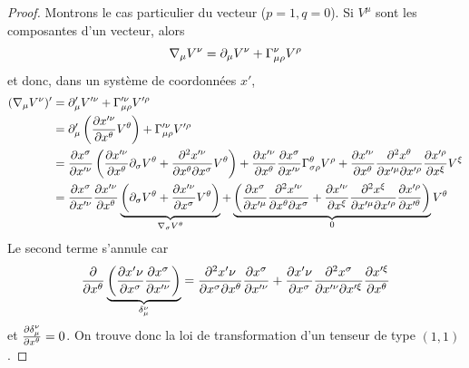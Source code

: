 \documentclass[a4paper,11pt]{report}
\begin{document}
                \begin{proof}
                    Montrons le cas particulier du vecteur ($p=1,q=0$). Si $V^\mu$ sont les composantes d'un vecteur, alors
                    \begin{equation}
                        \nabla_\mu V^\nu = \partial_\mu V^\nu + \Gamma^\nu_{\mu\rho} V^\rho
                    \end{equation}
                    et donc, dans un système de coordonnées $x'$, 
                    \begin{align}
                        (\nabla_\mu V^\nu)' &= \partial'_\mu V'^\nu + \Gamma'^\nu_{\mu\rho} V'^\rho \\
                        &= \partial'_\mu\left( \pdv{x'^\nu}{x^\theta} V^\theta\right) + \Gamma'^\nu_{\mu\rho} V'^\rho\\
                        &= \pdv{x^\sigma}{x'^\nu}\left( \pdv{x'^\nu}{x^\theta}\partial_\sigma V^\theta + \pdv{x'^\nu}{x^\theta}{x^\sigma} V^\theta \right) + \pdv{x'^\nu}{x^\theta}\pdv{x^\sigma}{x'^\nu}\Gamma^\theta_{\sigma\rho} V^\rho + \pdv{x'^\nu}{x^\theta}\pdv{x^\theta}{x'^\mu}{x'^\rho}\pdv{x'^\rho}{x^\xi} V^\xi\\
                        &=  \pdv{x^\sigma}{x'^\nu} \pdv{x'^\nu}{x^\theta}\underbrace{\left(\partial_\sigma V^\theta + \pdv{x'^\nu}{x^\sigma} V^\theta \right)}_{\nabla_\sigma V^\theta}+\underbrace{\left( \pdv{x^\sigma}{x'^\mu}\pdv{x'^\nu}{x^\theta}{x^\sigma}+\pdv{x'^\nu}{x^\xi}\pdv{x^\xi}{x'^\mu}{x'^\rho}\pdv{x'^\rho}{x'^\theta} \right)}_{0}V^\theta
                    \end{align}
                    Le second terme s'annule car
                    \begin{equation}
                        \pdv{}{x^\theta}\underbrace{\left( \pdv{x'\nu}{x^\sigma}\pdv{x^\sigma}{x'^\nu} \right)}_{\delta^\nu_\mu} = \pdv{x'\nu}{x^\sigma}{x^\theta}\pdv{x^\sigma}{x'^\nu} + \pdv{x'\nu}{x^\sigma}\pdv{x^\sigma}{x'^\nu}{x'^\xi}\pdv{x'^\xi}{x^\theta}
                    \end{equation}
                    et $ \pdv{\delta^\nu_\mu}{x^\theta} = 0$. On trouve donc la loi de transformation d'un tenseur de type $(1,1)$.
                \end{proof}
                
\end{document}

